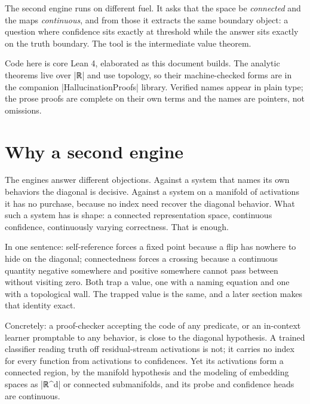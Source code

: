 \documentclass{memoir}
\begin{document}
The second engine runs on different fuel. It asks that the space be \emph{connected}
and the maps \emph{continuous}, and from those it extracts the same boundary object:
a question where confidence sits exactly at threshold while the answer sits
exactly on the truth boundary. The tool is the intermediate value theorem.

Code here is core Lean 4, elaborated as this document builds. The analytic
theorems live over \LeanVerb|ℝ| and use topology, so their machine-checked forms are in
the companion \LeanVerb|HallucinationProofs| library. Verified names appear in plain
type; the prose proofs are complete on their own terms and the names are
pointers, not omissions.



\section{Why a second engine}\label{Two--Schemas--of--Impossibility-005F-005F-005F--Machine--Checked--Limits--of--Trustworthy--Machine--Learning-005F-005F-005F--and--Why--They--Tighten--with--Capability----From--Logic--to--Analysis----Why--a--second--engine}

The engines answer different objections. Against a system that names its own
behaviors the diagonal is decisive. Against a system on a manifold of
activations it has no purchase, because no index need recover the diagonal
behavior. What such a system has is shape: a connected representation space,
continuous confidence, continuously varying correctness. That is enough.

In one sentence: self-reference forces a fixed point because a flip has nowhere
to hide on the diagonal; connectedness forces a crossing because a continuous
quantity negative somewhere and positive somewhere cannot pass between without
visiting zero. Both trap a value, one with a naming equation and one with a
topological wall. The trapped value is the same, and a later section makes that
identity exact.

Concretely: a proof-checker accepting the code of any predicate, or an
in-context learner promptable to any behavior, is close to the diagonal
hypothesis. A trained classifier reading truth off residual-stream activations
is not; it carries no index for every function from activations to confidences.
Yet its activations form a connected region, by the manifold hypothesis and the
modeling of embedding spaces as \LeanVerb|ℝ^d| or connected submanifolds, and its probe
and confidence heads are continuous.
\end{document}
